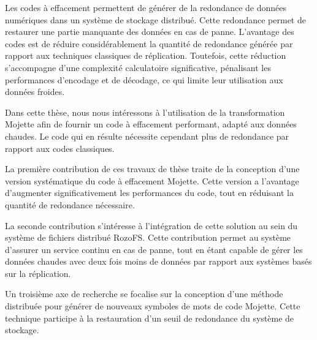 Les codes à effacement permettent de générer de la redondance de données
numériques dans un système de stockage distribué. Cette redondance permet
de restaurer une partie manquante des données en cas de panne. L'avantage des
codes est de réduire considérablement la quantité de redondance générée par
rapport aux techniques classiques de réplication. Toutefois, cette réduction
s'accompagne d'une complexité calculatoire significative, pénalisant les
performances d'encodage et de décodage, ce qui limite leur utilisation aux
données froides.

Dans cette thèse, nous nous intéressons à l'utilisation de la transformation
Mojette afin de fournir un code à effacement performant, adapté aux données
chaudes. Le code qui en résulte nécessite cependant plus de redondance par
rapport aux codes classiques.

La première contribution de ces travaux de thèse traite de la conception
d'une version systématique du code à effacement Mojette. Cette version a
l'avantage d'augmenter significativement les performances du code, tout en
réduisant la quantité de redondance nécessaire.

La seconde contribution s'intéresse à l'intégration de cette solution au sein
du système de fichiers distribué RozoFS.
Cette contribution permet au système d'assurer un service continu en cas de
panne, tout en étant capable de gérer les données chaudes avec deux fois moins
de données par rapport aux systèmes basés sur la réplication.

Un troisième axe de recherche se focalise sur la conception d'une méthode
distribuée pour générer de nouveaux symboles de mots de code Mojette. Cette
technique participe à la restauration d'un seuil de redondance du système de
stockage.
